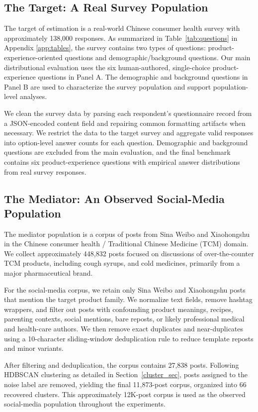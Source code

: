 \documentclass{article}
\begin{document}
\subsection{The Target: A Real Survey Population}

The target of estimation is a real-world Chinese consumer health survey with
approximately 138,000 responses.
As summarized in Table~\ref{tab:questions} in Appendix \ref{app:tables}, the survey contains two types of questions:
product-experience-oriented questions and demographic/background questions.
Our main distributional evaluation uses the six human-authored, single-choice
product-experience questions in Panel A.
The demographic and background questions in Panel B are used to characterize the survey
population and support population-level analyses.

We clean the survey data by parsing each respondent's questionnaire record from a
JSON-encoded content field and repairing common formatting artifacts when necessary.
We restrict the data to the target survey and aggregate valid responses into
option-level answer counts for each question.
Demographic and background questions are excluded from the main evaluation, and the
final benchmark contains six product-experience questions with empirical answer
distributions from real survey responses.

\subsection{The Mediator: An Observed Social-Media Population}

The mediator population is a corpus of posts from Sina Weibo and Xiaohongshu in the Chinese
consumer health / Traditional Chinese Medicine (TCM) domain.
We collect approximately 448,832 posts focused on discussions of over-the-counter TCM
products, including cough syrups, and cold medicines,
primarily from a major pharmaceutical brand.

For the social-media corpus, we retain only Sina Weibo and Xiaohongshu posts that mention the
target product family.
We normalize text fields, remove hashtag wrappers, and filter out posts with confounding
product meanings, recipes, parenting contexts, social mentions, bare reposts, or likely
professional medical and health-care authors.
We then remove exact duplicates and near-duplicates using a 10-character sliding-window
deduplication rule to reduce template reposts and minor variants.

After filtering and deduplication, the corpus contains 27,838 posts.
Following HDBSCAN clustering as detailed in Section~\ref{cluster_sec}, posts assigned to
the noise label are removed, yielding the final 11,873-post corpus, organized into 66
recovered clusters.
This approximately 12K-post corpus is used as the observed social-media population
throughout the experiments.
\end{document}
